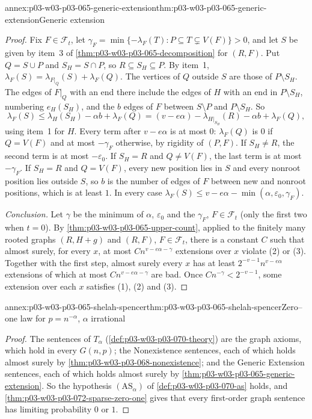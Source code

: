 \begin{annexitem}{annex:p03-w03-p03-065-generic-extension}{thm:p03-w03-p03-065-generic-extension}{Generic extension}
\begin{proof}
Fix \(F\in\mathcal F_t\), let \(\gamma_F=\min\{-\lambda_F(T):P\subseteq
T\subsetneq V(F)\}>0\), and let \(S\) be given by item~3 of
\cref{thm:p03-w03-p03-065-decomposition} for \((R,F)\).  Put \(Q=S\cup P\)
and \(S_H=S\cap P\), so \(R\subseteq S_H\subseteq P\).  By item~1,
\(\lambda_F(S)=\lambda_{F|_Q}(S)+\lambda_F(Q)\).  The vertices of \(Q\)
outside \(S\) are those of \(P\setminus S_H\).  The edges of \(F|_Q\) with an
end there include the edges of \(H\) with an end in \(P\setminus S_H\),
numbering \(e_H(S_H)\), and the \(b\) edges of \(F\) between
\(S\setminus P\) and \(P\setminus S_H\).  So
\[
  \lambda_F(S)\leq\lambda_H(S_H)-\alpha b+\lambda_F(Q)
  =(v-e\alpha)-\lambda_{H|_{S_H}}(R)-\alpha b+\lambda_F(Q),
\]
using item~1 for \(H\).  Every term after \(v-e\alpha\) is at most \(0\):
\(\lambda_F(Q)\) is \(0\) if \(Q=V(F)\) and at most \(-\gamma_F\) otherwise,
by rigidity of \((P,F)\).  If \(S_H\neq R\), the second term is at most
\(-\varepsilon_0\).  If \(S_H=R\) and \(Q\neq V(F)\), the last term is at
most \(-\gamma_F\).  If \(S_H=R\) and \(Q=V(F)\), every new position lies in
\(S\) and every nonroot position lies outside \(S\), so \(b\) is the number of
edges of \(F\) between new and nonroot positions, which is at least \(1\).
In every case \(\lambda_F(S)\leq v-e\alpha-\min(\alpha,\varepsilon_0,
\gamma_F)\).

\emph{Conclusion.}  Let \(\gamma\) be the minimum of \(\alpha\),
\(\varepsilon_0\) and the \(\gamma_F\), \(F\in\mathcal F_t\) (only the first
two when \(t=0\)).  By \cref{thm:p03-w03-p03-065-upper-count}, applied to
the finitely many rooted graphs \((R,H+g)\) and \((R,F)\),
\(F\in\mathcal F_t\), there is a constant \(C\) such that almost surely, for
every \(x\), at most \(Cn^{v-e\alpha-\gamma}\) extensions over \(x\) violate
(2) or (3).  Together with the first step, almost surely every \(x\) has at
least \(2^{-v-1}n^{v-e\alpha}\) extensions of which at most
\(Cn^{v-e\alpha-\gamma}\) are bad.  Once \(Cn^{-\gamma}<2^{-v-1}\), some
extension over each \(x\) satisfies (1), (2) and (3).
\end{proof}
\end{annexitem}

\begin{annexitem}{annex:p03-w03-p03-065-shelah-spencer}{thm:p03-w03-p03-065-shelah-spencer}{Zero--one law for \(p=n^{-\alpha}\), \(\alpha\) irrational}
\begin{proof}
The sentences of \(T_\alpha\) (\cref{def:p03-w03-p03-070-theory}) are the
graph axioms, which hold in every \(G(n,p)\); the Nonexistence sentences,
each of which holds almost surely by \cref{thm:p03-w03-p03-068-nonexistence};
and the Generic Extension sentences, each of which holds almost surely by
\cref{thm:p03-w03-p03-065-generic-extension}.  So the hypothesis
\((\mathrm{AS}_\alpha)\) of \cref{def:p03-w03-p03-070-as} holds, and
\cref{thm:p03-w03-p03-072-sparse-zero-one} gives that every first-order graph
sentence has limiting probability \(0\) or \(1\).
\end{proof}
\end{annexitem}
